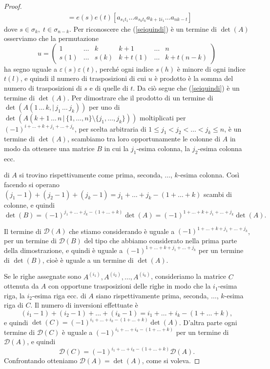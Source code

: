 \documentclass{article}
\theoremstyle{plain}
\theoremstyle{definition}
\theoremstyle{remark}
\begin{document}
\begin{proof}
\begin{equation}
\begin{aligned}
            &= e(s)e(t) [a_{s_1 t_1} \ldots a_{s_k t_k} a_{k+1 i_1} \ldots a_{n k-t}]   
        \end{aligned} \label{seiquindi}
    \end{equation}
    dove \( s \in \sigma_k,\; t \in \sigma_{n-k} \).
    Per riconoscere che (\ref{seiquindi}) è un termine di $\det(A)$ osserviamo che la permutazione
    \[
    u = \begin{pmatrix}
        1 & \ldots & k & k+1 & \ldots & n \\
        s(1) & \ldots & s(k) & k+t(1) & \ldots & k+t(n-k) 
    \end{pmatrix}
    \]
    ha segno uguale a \( \varepsilon(s)\varepsilon(t) \), perché ogni indice \( s(h) \) è minore di ogni indice \( t(l) \), e quindi il numero di trasposizioni di cui \( u \) è 
    prodotto è la somma del numero di trasposizioni di \( s \) e di quelle di \( t \). Da ciò segue che (\ref{seiquindi}) è un termine di $\det(A)$.
    Per dimostrare che il prodotto di un termine di $\det(A(1\,\ldots\, k,|\,j_1\,\ldots\,j_k))$ per uno di $\det(A(k+1\,\ldots\,n\,|\,\{1,\ldots,n\}\setminus\{j_1,\ldots,j_k\}))$ 
    moltiplicati per $(-1)^{i+\ldots+k+j_1+\ldots+j_k}$, per scelta arbitraria di $1\leq j_1<j_2<\ldots<j_k\leq n$, è un termine di $\det(A)$, scambiamo tra loro opportunamente le colonne di $A$ 
    in modo da ottenere una matrice $B$ in cui la $j_1$-esima colonna, la $j_2$-esima colonna ecc. 

    di \( A \) si trovino rispettivamente come prima, seconda, $\ldots$, \( k \)-esima colonna. 
    Così facendo si operano \((j_1 - 1) + (j_2 - 1) + (j_k - 1) = j_1 + \ldots + j_k - (1 + \ldots + k)\) scambi di colonne, e quindi
    \[\det(B) = (-1)^{j_1 + \ldots + j_k - (1 + \ldots + k)} \det(A) = (-1)^{1 + \ldots + k + j_1 + \ldots + j_k} \det(A).\]
    
    Il termine di \( \mathcal{D}(A) \) che stiamo considerando è uguale a \((-1)^{1 + \ldots + k + j_1 + \ldots + j_k} \), per un termine di \( \mathcal{D}(B) \) del tipo che abbiamo considerato nella prima parte della dimostrazione, 
    e quindi è uguale a \((-1)^{1 + \ldots + k + j_1 + \ldots + j_k} \) per un termine di \( \det(B) \), cioè è uguale a un termine di \( \det(A) \).
    
    Se le righe assegnate sono \( A^{(i_1)}, A^{(i_2)}, \ldots, A^{(i_k)} \), consideriamo la matrice \( C \) ottenuta da \( A \) con opportune trasposizioni delle righe in modo che la \( i_1 \)-esima riga, 
    la \( i_2 \)-esima riga ecc. di \( A \) siano rispettivamente prima, seconda, $\ldots$, \( k \)-esima riga di \( C \). Il numero di inversioni effettuate è
    \[(i_1 - 1) + (i_2 - 1) + \ldots + (i_k - 1) = i_1 + \ldots + i_k - (1 + \ldots + k),\]
    e quindi \(\det(C) = (-1)^{i_1 + \ldots + i_k - (1 + \ldots + k)} \det(A)\). D'altra parte ogni termine di \( \mathcal{D}(C) \) è uguale a \((-1)^{i_1 + \ldots + i_k - (1 + \ldots + k)}\) per un termine 
    di \( \mathcal{D}(A) \), e quindi
    \[
        \mathcal{D}(C) = (-1)^{i_1 + \ldots + i_k - (1 + \ldots + k)} \mathcal{D}(A).
    \]
    Confrontando otteniamo \( \mathcal{D}(A) = \det(A) \), come si voleva.
\end{proof}
\end{document}
